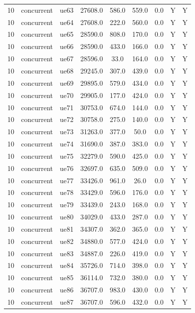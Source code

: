 \begin{table}[ht]
\begin{tabular}{|c|c|c|c|c|c|c|c|c|}
10 & concurrent & ue63 & 27608.0 & 586.0 & 559.0 & 0.0 & Y & Y \\
10 & concurrent & ue64 & 27608.0 & 222.0 & 560.0 & 0.0 & Y & Y \\
10 & concurrent & ue65 & 28590.0 & 808.0 & 170.0 & 0.0 & Y & Y \\
10 & concurrent & ue66 & 28590.0 & 433.0 & 166.0 & 0.0 & Y & Y \\
10 & concurrent & ue67 & 28596.0 & 33.0 & 164.0 & 0.0 & Y & Y \\
10 & concurrent & ue68 & 29245.0 & 307.0 & 439.0 & 0.0 & Y & Y \\
10 & concurrent & ue69 & 29895.0 & 579.0 & 434.0 & 0.0 & Y & Y \\
10 & concurrent & ue70 & 29905.0 & 177.0 & 424.0 & 0.0 & Y & Y \\
10 & concurrent & ue71 & 30753.0 & 674.0 & 144.0 & 0.0 & Y & Y \\
10 & concurrent & ue72 & 30758.0 & 275.0 & 140.0 & 0.0 & Y & Y \\
10 & concurrent & ue73 & 31263.0 & 377.0 & 50.0 & 0.0 & Y & Y \\
10 & concurrent & ue74 & 31690.0 & 387.0 & 383.0 & 0.0 & Y & Y \\
10 & concurrent & ue75 & 32279.0 & 590.0 & 425.0 & 0.0 & Y & Y \\
10 & concurrent & ue76 & 32697.0 & 635.0 & 509.0 & 0.0 & Y & Y \\
10 & concurrent & ue77 & 33426.0 & 961.0 & 26.0 & 0.0 & Y & Y \\
10 & concurrent & ue78 & 33429.0 & 596.0 & 176.0 & 0.0 & Y & Y \\
10 & concurrent & ue79 & 33439.0 & 243.0 & 168.0 & 0.0 & Y & Y \\
10 & concurrent & ue80 & 34029.0 & 433.0 & 287.0 & 0.0 & Y & Y \\
10 & concurrent & ue81 & 34307.0 & 362.0 & 365.0 & 0.0 & Y & Y \\
10 & concurrent & ue82 & 34880.0 & 577.0 & 424.0 & 0.0 & Y & Y \\
10 & concurrent & ue83 & 34887.0 & 226.0 & 419.0 & 0.0 & Y & Y \\
10 & concurrent & ue84 & 35726.0 & 714.0 & 398.0 & 0.0 & Y & Y \\
10 & concurrent & ue85 & 36114.0 & 732.0 & 380.0 & 0.0 & Y & Y \\
10 & concurrent & ue86 & 36707.0 & 983.0 & 430.0 & 0.0 & Y & Y \\
10 & concurrent & ue87 & 36707.0 & 596.0 & 432.0 & 0.0 & Y & Y \\

\end{tabular}
\end{table}
